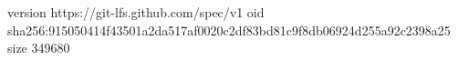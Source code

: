 version https://git-lfs.github.com/spec/v1
oid sha256:915050414f43501a2da517af0020c2df83bd81c9f8db06924d255a92c2398a25
size 349680
